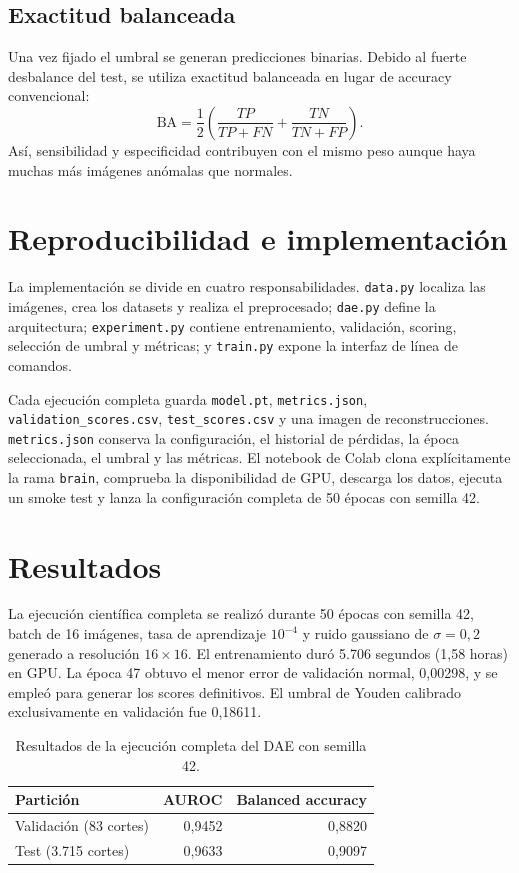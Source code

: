 \documentclass[10pt,a4paper,twocolumn]{article}
\begin{document}
\subsection{Exactitud balanceada}
Una vez fijado el umbral se generan predicciones binarias. Debido al fuerte
desbalance del test, se utiliza exactitud balanceada en lugar de accuracy
convencional:
\[
 \mathrm{BA}=\frac{1}{2}\left(
 \frac{TP}{TP+FN}+\frac{TN}{TN+FP}
 \right).
\]
Así, sensibilidad y especificidad contribuyen con el mismo peso aunque haya
muchas más imágenes anómalas que normales.

\section{Reproducibilidad e implementación}
La implementación se divide en cuatro responsabilidades. \texttt{data.py}
localiza las imágenes, crea los datasets y realiza el preprocesado;
\texttt{dae.py} define la arquitectura; \texttt{experiment.py} contiene
entrenamiento, validación, scoring, selección de umbral y métricas; y
\texttt{train.py} expone la interfaz de línea de comandos.

Cada ejecución completa guarda \texttt{model.pt}, \texttt{metrics.json},
\texttt{validation\_scores.csv}, \texttt{test\_scores.csv} y una imagen de
reconstrucciones. \texttt{metrics.json} conserva la configuración, el historial
de pérdidas, la época seleccionada, el umbral y las métricas. El notebook de
Colab clona explícitamente la rama \texttt{brain}, comprueba la disponibilidad
de GPU, descarga los datos, ejecuta un smoke test y lanza la configuración
completa de 50 épocas con semilla 42.

\section{Resultados}
La ejecución científica completa se realizó durante 50 épocas con semilla 42,
batch de 16 imágenes, tasa de aprendizaje $10^{-4}$ y ruido gaussiano de
$\sigma=0{,}2$ generado a resolución $16\times16$. El entrenamiento duró
5.706 segundos (1,58 horas) en GPU. La época 47 obtuvo el menor error de
validación normal, 0,00298, y se empleó para generar los scores definitivos. El
umbral de Youden calibrado exclusivamente en validación fue 0,18611.

\begin{table}[ht]
\centering
\small
\begin{tabular}{lrr}
\toprule
Partición & AUROC & Balanced accuracy \\
\midrule
Validación (83 cortes) & 0,9452 & 0,8820 \\
Test (3.715 cortes) & 0,9633 & 0,9097 \\
\bottomrule
\end{tabular}
\caption{Resultados de la ejecución completa del DAE con semilla 42.}
\label{tab:results}
\end{table}
\end{document}
